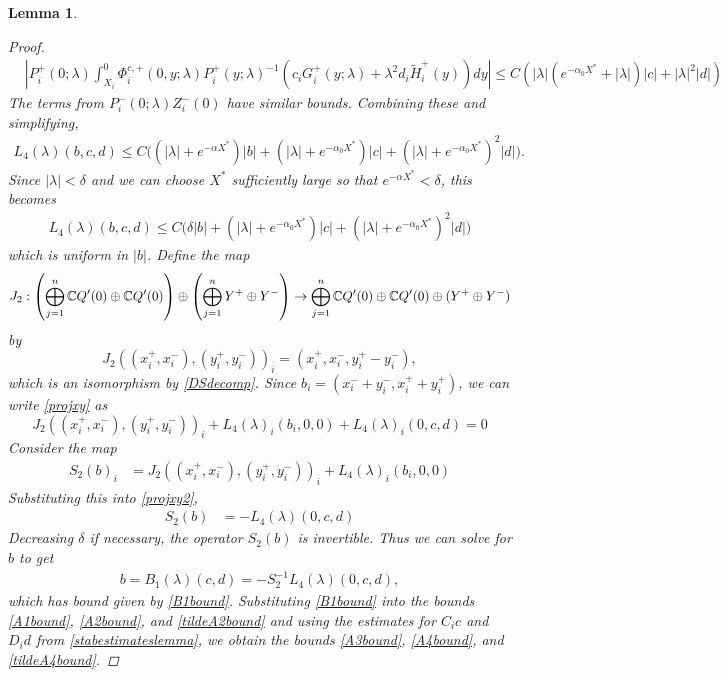 \documentclass[10pt,reqno]{amsart}
\theoremstyle{plain}
\newtheorem{lemma}[theorem]{Lemma}
\theoremstyle{definition}
\theoremstyle{remark}
\numberwithin{theorem}{section}
\numberwithin{equation}{section}
\begin{document}
\begin{lemma}
\begin{proof}
\begin{align*}
&\left| P_i^+(0; \lambda) \int_{X_i}^0 \Phi_i^{c,+}(0, y; \lambda) P_i^+(y; \lambda)^{-1}( c_i G_i^+(y; \lambda) + \lambda^2 d_i \tilde{H}_i^+(y)) dy  \right| \leq C \left( |\lambda|(e^{-\alpha_0 X^*} + |\lambda|)|c| + |\lambda|^2 |d| \right)
\end{align*}
The terms from $P_i^-(0; \lambda) Z_i^-(0)$ have similar bounds. Combining these and simplifying,
\begin{align*}
L_4(\lambda)(b, c, d) \leq 
C\Big( (|\lambda| + e^{-\alpha X^*})|b| + (|\lambda|+e^{-\alpha_0 X^*})|c| + (|\lambda| + e^{-\alpha_0 X^*})^2 |d|  \Big).
\end{align*}
Since $|\lambda| < \delta$ and we can choose $X^*$ sufficiently large so that $e^{-\alpha X^*} < \delta$, this becomes
\begin{align*}
L_4(\lambda)(b, c, d) \leq 
C\Big( \delta |b| + (|\lambda|+e^{-\alpha_0 X^*})|c| + (|\lambda| + e^{-\alpha_0 X^*})^2 |d| \Big) 
\end{align*}
which is uniform in $|b|$. Define the map
\[
J_2: \left( \bigoplus_{j=1}^n \mathbb{C} Q'(0) \oplus \mathbb{C} Q'(0)  \right) \oplus
\left( \bigoplus_{j=1}^n Y^+ \oplus Y^- \right) 
\rightarrow \bigoplus_{j=1}^n \mathbb{C} Q'(0) \oplus \mathbb{C} Q'(0) \oplus (Y^+ \oplus Y^-)
\]
by 
\[
J_2( (x_i^+, x_i^-),(y_i^+, y_i^-))_i = ( x_i^+, x_i^-, y_i^+ - y_i^- ),
\]
which is an isomorphism by \cref{DSdecomp}. Since $b_i = (x_i^- + y_i^-, x_i^+ + y_i^+)$, we can write \cref{projxy} as
\begin{equation}\label{projxy2}
J_2( (x_i^+, x_i^-),(y_i^+, y_i^-))_i 
+ L_4(\lambda)_i(b_i, 0, 0) + L_4(\lambda)_i(0, c, d) = 0
\end{equation}
Consider the map
\begin{align*}
S_2(b)_i &= J_2( (x_i^+, x_i^-),(y_i^+, y_i^-))_i 
+ L_4(\lambda)_i(b_i, 0, 0) 
\end{align*}
Substituting this into \cref{projxy2},
\begin{align*}
S_2(b) &= -L_4(\lambda)(0, c, d)
\end{align*}
Decreasing $\delta$ if necessary, the operator $S_2(b)$ is invertible. Thus we can solve for $b$ to get
\begin{align}
b = B_1(\lambda)(c,d) 
= -S_2^{-1} L_4(\lambda)(0, c, d),
\end{align}
which has bound given by \cref{B1bound}. Substituting \cref{B1bound} into the bounds \cref{A1bound}, \cref{A2bound}, and \cref{tildeA2bound} and using the estimates for $C_i c$ and $D_i d $ from \cref{stabestimateslemma}, we obtain the bounds \cref{A3bound}, \cref{A4bound}, and \cref{tildeA4bound}.
\end{proof}
\end{lemma}
\end{document}
